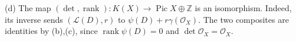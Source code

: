 (d) The map $(\det,\operatorname{rank}):K(X)\to\operatorname{Pic}X\oplus\mathbb Z$ is an isomorphism. Indeed, its inverse sends $(\mathcal L(D),r)$ to $\psi(D)+r\gamma(\mathcal O_X)$. The two composites are identities by (b),(c), since $\operatorname{rank}\psi(D)=0$ and $\det\mathcal O_X=\mathcal O_X$.
